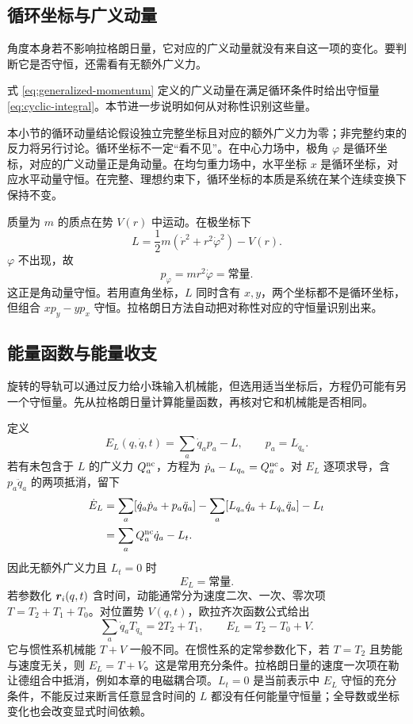 \subsection{循环坐标与广义动量}

角度本身若不影响拉格朗日量，它对应的广义动量就没有来自这一项的变化。要判断它是否守恒，还需看有无额外广义力。

式 \eqref{eq:generalized-momentum} 定义的广义动量在满足循环条件时给出守恒量 \eqref{eq:cyclic-integral}。本节进一步说明如何从对称性识别这些量。

本小节的循环动量结论假设独立完整坐标且对应的额外广义力为零；非完整约束的反力将另行讨论。循环坐标不一定“看不见”。在中心力场中，极角 $\varphi$ 是循环坐标，对应的广义动量正是角动量。在均匀重力场中，水平坐标 $x$ 是循环坐标，对应水平动量守恒。在完整、理想约束下，循环坐标的本质是系统在某个连续变换下保持不变。

\begin{example}[中心力场的角动量]
质量为 $m$ 的质点在势 $V(r)$ 中运动。在极坐标下
\[
L=\frac12m\left(\dot r^2+r^2\dot\varphi^2\right)-V(r).
\]
$\varphi$ 不出现，故
\[
p_\varphi=mr^2\dot\varphi=\text{常量}.
\]
这正是角动量守恒。若用直角坐标，$L$ 同时含有 $x,y$，两个坐标都不是循环坐标，但组合 $xp_y-yp_x$ 守恒。拉格朗日方法自动把对称性对应的守恒量识别出来。
\end{example}

\subsection{能量函数与能量收支}
旋转的导轨可以通过反力给小珠输入机械能，但选用适当坐标后，方程仍可能有另一个守恒量。先从拉格朗日量计算能量函数，再核对它和机械能是否相同。

定义
\begin{equation}\label{eq:energy-function}
E_L(q,\dot q,t)=\sum_a\dot q_ap_a-L,\qquad p_a=L_{\dot q_a}.
\end{equation}
若有未包含于 $L$ 的广义力 $Q_a^{\rm nc}$，方程为 $\dot p_a-L_{q_a}=Q_a^{\rm nc}$。对 $E_L$ 逐项求导，含 $p_a\ddot q_a$ 的两项抵消，留下
\begin{align}\label{eq:energy-function-derivative}
\dot E_L
&=\sum_a[\dot q_a\dot p_a+p_a\ddot q_a]
-\sum_a[L_{q_a}\dot q_a+L_{\dot q_a}\ddot q_a]-L_t\nonumber\\
&=\sum_a Q_a^{\rm nc}\dot q_a-L_t.
\end{align}
因此无额外广义力且 $L_t=0$ 时
\begin{equation}\label{eq:energy-integral}
E_L=\text{常量}.
\end{equation}
若参数化 $\boldsymbol{r}_i(q,t)$ 含时间，动能通常分为速度二次、一次、零次项 $T=T_2+T_1+T_0$。对位置势 $V(q,t)$，欧拉齐次函数公式给出
\[
\sum_a\dot q_aT_{\dot q_a}=2T_2+T_1,\qquad
E_L=T_2-T_0+V.
\]
它与惯性系机械能 $T+V$ 一般不同。在惯性系的定常参数化下，若 $T=T_2$ 且势能与速度无关，则 $E_L=T+V$。这是常用充分条件。拉格朗日量的速度一次项在勒让德组合中抵消，例如本章的电磁耦合项。$L_t=0$ 是当前表示中 $E_L$ 守恒的充分条件，不能反过来断言任意显含时间的 $L$ 都没有任何能量守恒量；全导数或坐标变化也会改变显式时间依赖。

